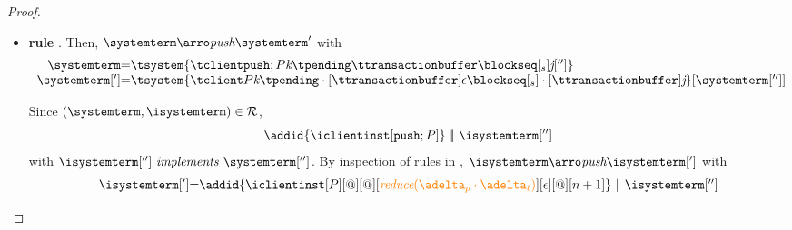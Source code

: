\begin{proof}
\begin{itemize}
\begin{itemize}
				We  prove that $(\systemterm',\isystemterm') \ \in \ \mathcal{R}$ by showing that $\implements{\isystemterm[']}{\systemterm[']}$ 
				by checking the properties in .			
					\begin{enumerate}
						\item The only terms that have changed are the transaction buffers in client $\cid$. Since 
						$\implements{\isystemterm}{\systemterm}$, the following holds
						\begin{itemize}
							\item $\transactionbuffer \triangleleft{\ttransactionbuffer}$ by property \ref{prop_transactions};
						\end{itemize}
						
						Then, we can build the following proof for 
						$\iappend{\transactionbuffer}{u}
						\triangleleft 
						\ttransactionbuffer \cdot \tupdate$
						\[
						  \mathrulean{\triangappend}
						      {
						      \transactionbuffer \triangleleft{\ttransactionbuffer}
						      }
  						{\iappend{\transactionbuffer}{u}]
						\triangleleft 
						\ttransactionbuffer \cdot \tupdate}  
					\]

						 .

						\item to 9 straightforwardly hold.
						

					\end{enumerate}
	
	
			\item {\bf rule }. Then, $\systemterm  \arroi{\pushtran} \systemterm '$ with 
				\[\begin{array}{r@{=}l}
					\systemterm & \tsystem{\tclienti{\tpushins}{\tknown}{\tpending}{\ttransactionbuffer}{\tsent}{\treceivebuffer}['']}
					\\
					\systemterm['] & \tsystem{\tclienti{\tprogram}{\tknown}{\tpending \cdot [\ttransactionbuffer]}{\epsilon}{\tsent \cdot [\ttransactionbuffer]}{\treceivebuffer}}[{\systemterm['']}]
				  \end{array}
				\]
		
				Since $(\systemterm,\isystemterm)\in \mathcal{R}$,
				\[ \addid{\iclientinst[\tpushins]} \ \bigpar \ \isystemterm['']\]
				with $\implements{\isystemterm['']}{\systemterm['']}$. By inspection of rules in \figref{}, 
				$\isystemterm \arroi{\pushtran} \isystemterm[']$ with
				\[\begin{array}{r@{=}l}
					\isystemterm['] & {\addid{\iclientinst[P][@][@][\ireduce{\pushbuffer\cdot \transactionbuffer}][\epsilon][@][n+1]}\ \bigpar \ \isystemterm['']}	\\
				  \end{array}		
				\]
				

\end{itemize}
\end{itemize}
\end{proof}
